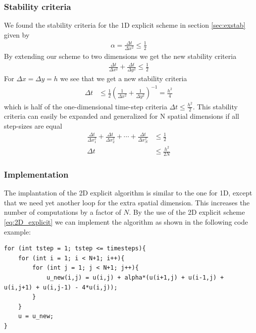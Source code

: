 \documentclass[%
 reprint,
nofootinbib,
aps,
]{revtex4-1}
\begin{document}
\subsubsection{Stability criteria}
We found the stability criteria for the 1D explicit scheme in section \ref{sec:exstab} given by \begin{align*}
    \alpha = \frac{\Delta t}{\Delta x^2} \le \frac{1}{2}
\end{align*}
By extending our scheme to two dimensions we get the new stability criteria
\begin{align*}
    \frac{\Delta t}{\Delta x^2} + \frac{\Delta t}{\Delta y^2} \le \frac{1}{2}
\end{align*}
For $\Delta x  =\Delta y = h$ we see that we get a new stability criteria
\begin{align*}
    \Delta t &\le \frac{1}{2} \left( \frac{1}{\Delta x^2} + \frac{1}{\Delta y^2} \right)^{-1} = \frac{h^2}{4}
\end{align*}
which is half of the one-dimensional time-step criteria $\Delta t \le \frac{h^2}{2}$. This stability criteria can easily be expanded and generalized for N spatial dimensions if all step-sizes are equal
\begin{align*}
    \frac{\Delta t}{\Delta x_1^2} + \frac{\Delta t}{\Delta x_2^2} + \cdots + \frac{\Delta t}{\Delta x_N^2} &\leq \frac{1}{2}\\
    \Delta t &\leq \frac{h^2}{2N}
\end{align*}

\subsubsection{Implementation}
The implantation of the 2D explicit algorithm is similar to the one for 1D, except that we need yet another loop for the extra spatial dimension. This increases the number of computations by a factor of $N$. By the use of the 2D explicit scheme \ref{eq:2D_explicit} we can implement the algorithm as shown in the following code example:
\begin{verbatim}
for (int tstep = 1; tstep <= timesteps){
    for (int i = 1; i < N+1; i++){
        for (int j = 1; j < N+1; j++){
			u_new(i,j) = u(i,j) + alpha*(u(i+1,j) + u(i-1,j) + u(i,j+1) + u(i,j-1) - 4*u(i,j));
		}
    }
    u = u_new;
}
\end{verbatim}
%
%
\end{document}
